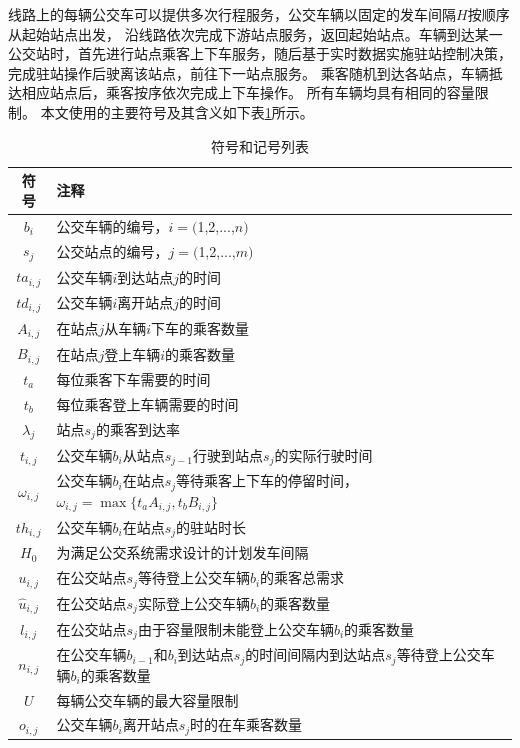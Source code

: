 线路上的每辆公交车可以提供多次行程服务，公交车辆以固定的发车间隔$H$按顺序从起始站点出发，
沿线路依次完成下游站点服务，返回起始站点。车辆到达某一公交站时，首先进行站点乘客上下车服务，随后基于实时数据实施驻站控制决策，
完成驻站操作后驶离该站点，前往下一站点服务。
乘客随机到达各站点，车辆抵达相应站点后，乘客按序依次完成上下车操作\cite{刘东2024基于深度强化学习的单线路公交动态驻站控制策略研究}。
所有车辆均具有相同的容量限制。
本文使用的主要符号及其含义如下表\ref{tab3-1}所示。
\begin{table}[!ht]
\centering
\caption{符号和记号列表}
\label{tab3-1}
\begin{tabular}{cp{}}
\toprule
\textbf{符号} & \textbf{注释} \\
\midrule
$b_{i}$ & 公交车辆的编号，$i=($1,2,...,$n)$ \\
$s_{j}$ & 公交站点的编号，$j=($1,2,...,$m)$ \\
$ta_{i,j}$ & 公交车辆$i$到达站点$j$的时间 \\
$td_{i,j}$ & 公交车辆$i$离开站点$j$的时间 \\
$A_{i,j}$ & 在站点$j$从车辆$i$下车的乘客数量 \\
$B_{i,j}$ & 在站点$j$登上车辆$i$的乘客数量 \\
$t_{a}$ & 每位乘客下车需要的时间 \\
$t_{b}$ & 每位乘客登上车辆需要的时间 \\
$\lambda_{j}$ & 站点$s_{j}$的乘客到达率 \\
$t_{i,j}$ & 公交车辆$b_{i}$从站点$s_{j-1}$行驶到站点$s_{j}$的实际行驶时间 \\
$\omega_{i,j}$ & 公交车辆$b_{i}$在站点$s_{j}$等待乘客上下车的停留时间，$\omega_{i,j} = \max\{ t_{a}A_{i,j} ,t_{b}B_{i,j}\} $\\
$th_{i,j}$ & 公交车辆$b_{i}$在站点$s_{j}$的驻站时长 \\
$H_0$ & 为满足公交系统需求设计的计划发车间隔\\
$u_{i,j}$ & 在公交站点$s_{j}$等待登上公交车辆$b_{i}$的乘客总需求 \\
$\hat{u}_{i,j}$ & 在公交站点$s_{j}$实际登上公交车辆$b_{i}$的乘客数量 \\
$l_{i,j} $ & 在公交站点$s_{j}$由于容量限制未能登上公交车辆$b_{i}$的乘客数量 \\
$n_{i,j}$ & 在公交车辆$b_{i-1}$和$b_{i}$到达站点$s_{j}$的时间间隔内到达站点$s_{j}$等待登上公交车辆$b_{i}$的乘客数量\\
$U$ & 每辆公交车辆的最大容量限制 \\
$o_{i,j}$ & 公交车辆$b_{i}$离开站点$s_{j}$时的在车乘客数量 \\

\end{tabular}
\end{table}
